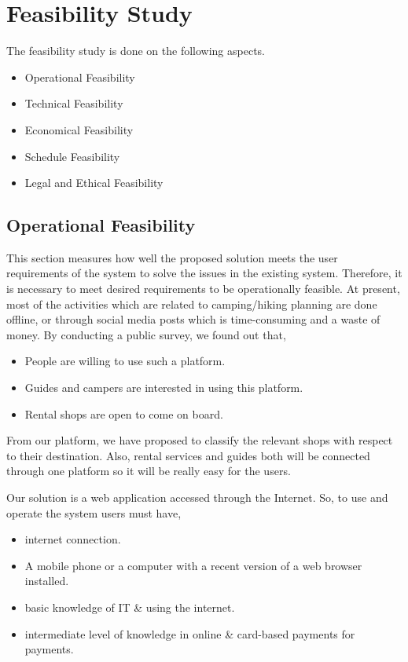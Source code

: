 \section{Feasibility Study}
The feasibility study is done on the following aspects.
\begin{itemize}
    \item Operational Feasibility
    \item Technical Feasibility
    \item Economical Feasibility
    \item Schedule Feasibility
    \item Legal and Ethical Feasibility
\end{itemize}

\subsection{Operational Feasibility}
This section measures how well the proposed solution meets the user requirements
of the system to solve the issues in the existing system. Therefore, it is necessary to
meet desired requirements to be operationally feasible. 
At present, most of the activities which are related to camping/hiking planning are done offline, or through social media posts which is time-consuming and a waste of money. 
By conducting a public survey, we found out that,
\begin{itemize}
\itemsep0em 
    \item People are willing to use such a platform.
    \item Guides and campers are interested in using this platform.
    \item Rental shops are open to come on board.
\end{itemize}



From our platform, we have proposed to classify the relevant shops with respect to their destination. Also, rental services and guides both will be connected through one platform so it will be really easy for the users.


Our solution is a web application accessed through the Internet. So, to use and operate the system users must have,
\begin{itemize}
\itemsep0em 
    \item internet connection.
    \item A mobile phone or a computer with a recent version of a web browser installed.
    \item basic knowledge of IT \& using the internet.
    \item intermediate level of knowledge in online \& card-based payments for payments.

\end{itemize}


